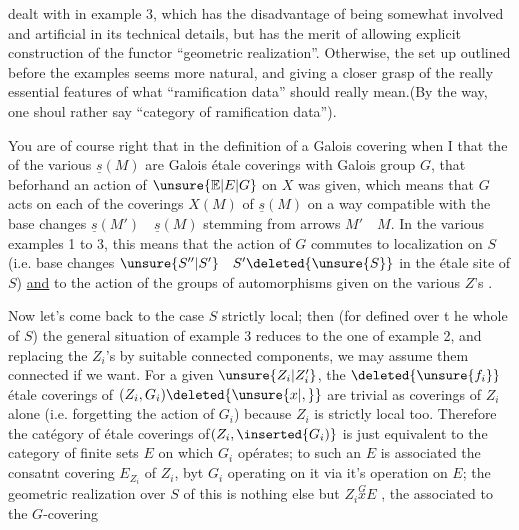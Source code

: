 dealt with in example 3, which has the disadvantage of being somewhat involved and artificial in its technical details, but has the merit of allowing explicit construction of the functor ``geometric realization''. Otherwise, the set up outlined before the examples seems more natural, and giving a closer grasp of the  really essential features of what ``ramification data'' should really mean.(By the way, one shoul rather say ``category of ramification data'').

You are of course right that in the definition of a Galois covering when I  that the  of the various $\underline{s}(M)$ are Galois étale coverings with Galois group $G$, that beforhand an action of $\unsure{\mathbb{E}|E|G}$ on $X$ was given, which means that $G$ acts on each of the coverings $X(M)$ of $\underline{s}(M)$ on a way compatible with the base changes $\underline{s}(M')\quad\underline{s}(M)$ stemming from arrows  $M'\quad M$. In the various examples 1 to 3, this means that the action of $G$ commutes to  localization on $S$ (i.e. base changes $\unsure{S''|S'}\quad S'\deleted{\unsure{S}}$ in the étale site of $S$) \uline{and} to the action of the groups of automorphisms given on the various $Z$'s .

Now let's come back to the case $S$ strictly local; then (for  defined over t he whole of $S$) the general situation of example 3 reduces to the one of example 2, and replacing the $Z_i$'s by suitable connected components, we may assume them connected if we want. For a given $\unsure{Z_i|Z_i'}$, the $\deleted{\unsure{f_i}}$ étale coverings of $(Z_i,G_i)\deleted{\unsure{x|,}}$ are trivial as coverings of $Z_i$ alone (i.e. forgetting the action of $G_i$) because $Z_i$ is strictly local too. Therefore the catégory of étale coverings of$(Z_i,\inserted{G_i)}$ is just equivalent to the category of finite sets $E$ on which $G_i$ opérates; to such an $E$ is associated the consatnt covering $E_{Z_i}$ of $Z_i$, byt $G_i$ operating on it via it's operation on $E$; the geometric realization over $S$ of this is nothing else but $Z_i\overset{G}{x}E$ , the  associated to the $G$-covering
